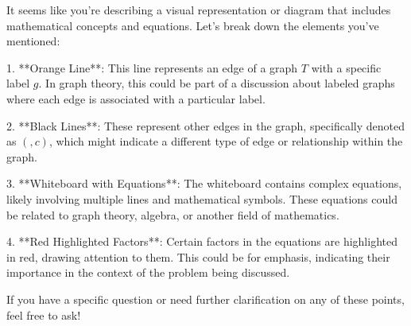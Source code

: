 It seems like you're describing a visual representation or diagram that includes mathematical concepts and equations. Let's break down the elements you've mentioned:

1. **Orange Line**: This line represents an edge of a graph \( T \) with a specific label \( g \). In graph theory, this could be part of a discussion about labeled graphs where each edge is associated with a particular label.

2. **Black Lines**: These represent other edges in the graph, specifically denoted as \( (,c) \), which might indicate a different type of edge or relationship within the graph.

3. **Whiteboard with Equations**: The whiteboard contains complex equations, likely involving multiple lines and mathematical symbols. These equations could be related to graph theory, algebra, or another field of mathematics.

4. **Red Highlighted Factors**: Certain factors in the equations are highlighted in red, drawing attention to them. This could be for emphasis, indicating their importance in the context of the problem being discussed.

If you have a specific question or need further clarification on any of these points, feel free to ask!